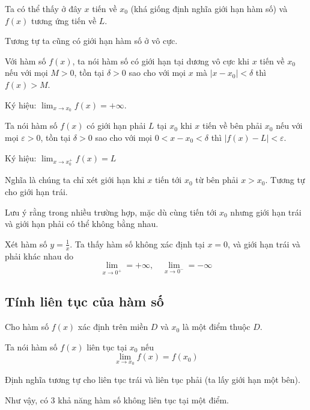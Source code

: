 Ta có thể thấy ở đây $x$ tiến về $x_0$ (khá giống định nghĩa giới hạn hàm số) và $f(x)$ tương ứng tiến về $L$.

Tương tự ta cũng có giới hạn hàm số ở vô cực.

\begin{definition}
    Với hàm số $f(x)$, ta nói hàm số có giới hạn tại dương vô cực khi $x$ tiến về $x_0$ nếu với mọi $M > 0$, tồn tại $\delta > 0$ sao cho với mọi $x$ mà $|x - x_0| < \delta$ thì $f(x) > M$.

    Ký hiệu: $\displaystyle{\lim_{x \to x_0} f(x) = +\infty}$.
\end{definition}

\begin{definition}
    Ta nói hàm số $f(x)$ có giới hạn phải $L$ tại $x_0$ khi $x$ tiến về bên phải $x_0$ nếu với mọi $\varepsilon > 0$, tồn tại $\delta > 0$ sao cho với mọi $0 < x - x_0 < \delta$  thì $|f(x) - L| < \varepsilon$.

    Ký hiệu: $\displaystyle{\lim_{x \to x_0^+} f(x) = L}$
\end{definition}

Nghĩa là chúng ta chỉ xét giới hạn khi $x$ tiến tới $x_0$ từ bên phải $x > x_0$. Tương tự cho giới hạn trái.

Lưu ý rằng trong nhiều trường hợp, mặc dù cùng tiến tới $x_0$ nhưng giới hạn trái và giới hạn phải có thể không bằng nhau.

\begin{example}
    Xét hàm số $y = \frac{1}{x}$. Ta thấy hàm số không xác định tại $x = 0$, và giới hạn trái và phải khác nhau do \[\lim_{x \to 0^+} = +\infty, \quad \lim_{x \to 0^-} = -\infty\]
\end{example}

\subsection*{Tính liên tục của hàm số}

Cho hàm số $f(x)$ xác định trên miền $D$ và $x_0$ là một điểm thuộc $D$.

\begin{definition}
    Ta nói hàm số $f(x)$ liên tục tại $x_0$ nếu \[\lim_{x \to x_0} f(x) = f(x_0)\]
\end{definition}

Định nghĩa tương tự cho liên tục trái và liên tục phải (ta lấy giới hạn một bên).

Như vậy, có 3 khả năng hàm số không liên tục tại một điểm.

